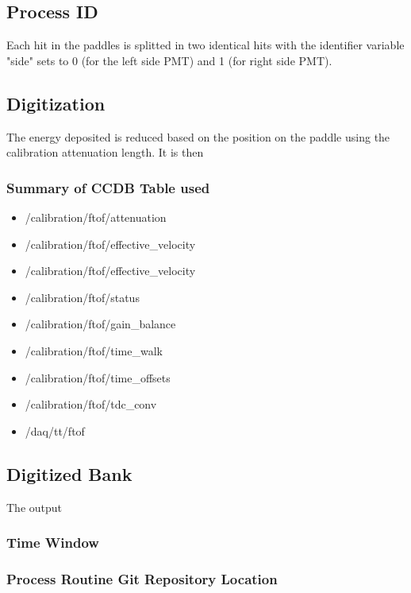 \subsection{Process ID}
Each hit in the paddles is splitted in two identical hits with the identifier variable "side" sets to 0 (for the left side PMT) and 1 (for right side PMT).

\subsection{Digitization}

The energy deposited is reduced based on the position on the paddle using the calibration attenuation length. It is then

\subsubsection{Summary of CCDB Table used}
\begin{itemize}
	\item /calibration/ftof/attenuation
	\item /calibration/ftof/effective_velocity
	\item /calibration/ftof/effective_velocity
	\item /calibration/ftof/status
	\item /calibration/ftof/gain_balance
	\item /calibration/ftof/time_walk
	\item /calibration/ftof/time_offsets
	\item /calibration/ftof/tdc_conv
	\item /daq/tt/ftof
\end{itemize}

\subsection{Digitized Bank}
The output



\subsubsection{Time Window}

\subsubsection{Process Routine Git Repository Location}


